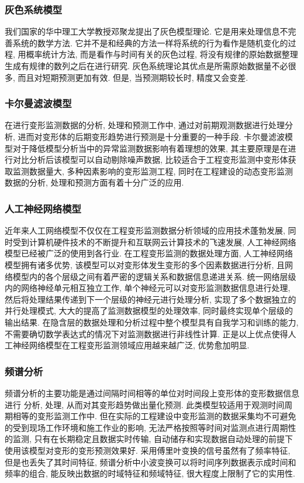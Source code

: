 \subsubsection*{灰色系统模型}
我们国家的华中理工大学教授邓聚龙提出了灰色模型理论. 它是用来处理信息不完善系统的数学方法. 它并不是和经典的方法一样将系统的行为看作是随机变化的过程, 用概率统计方法, 而是看作与时间有关的灰色过程, 将没有规律的原始数据整理生成有规律的数列之后在进行研究. 灰色系统理论其优点是所需原始数据量不必很多, 而且对短期预测更加有效. 但是, 当预测期较长时, 精度又会变差. 

\subsubsection*{卡尔曼滤波模型}
在进行变形监测数据的分析, 处理和预测工作中, 通过对前期观测数据进行处理分析, 进而对变形体的后期变形趋势进行预测是十分重要的一种手段. 卡尔曼滤波模型对于降低模型分析当中的异常监测数据影响有着理想的效果, 其主要原理是在进行对比分析后该模型可以自动剔除噪声数据, 比较适合于工程变形监测中变形体获取监测数据量大, 多种因素影响的变形监测工程, 同时在工程建设的动态变形监测数据的分析, 处理和预测方面有着十分广泛的应用. 

\subsubsection*{人工神经网络模型}
近年来人工网络模型不仅仅在工程变形监测数据分析领域的应用技术蓬勃发展, 同时受到计算机硬件技术的不断提升和互联网云计算技术的飞速发展, 人工神经网络模型已经被广泛的使用到各行业. 在工程变形监测的数据处理方面, 人工神经网络模型拥有诸多优势, 该模型可以对变形体发生变形的多个因素数据进行分析, 且网络模型内的各个层级之间有着严密的逻辑关系和数据信息递进关系. 统一网络层级内的网络神经单元相互独立工作, 单个神经元可以对变形监测数据信息进行处理, 然后将处理结果传递到下一个层级的神经元进行处理分析, 实现了多个数据独立的并行处理模式, 大大的提高了监测数据模型的处理效率, 同时最终实现单个层级的输出结果. 在隐含层的数据处理和分析过程中整个模型具有自我学习和训练的能力, 不需要确切数学表达式的情况下对监测数据进行非线性计算. 正是以上优点使得人工神经网络模型在工程变形监测领域应用越来越广泛, 优势愈加明显. 

\subsubsection*{频谱分析}
频谱分析的主要功能是通过间隔时间相等的单位对时间段上变形体的变形数据信息进行 分析, 处理, 从而对其变形趋势做出量化预测. 此类模型较适用于观测时间周期相等的变形监测工作中. 但在实际的工程建设中变形监测的数据采集均不可避免的受到现场工作环境和施工作业的影响, 无法严格按照等时间对监测点进行周期性的监测, 只有在长期稳定且数据实时传输, 自动储存和实现数据自动处理的前提下使用该模型对变形的变形预测效果好. 采用傅里叶变换的信号虽然有了频率特征, 但是也丢失了其时间特征, 频谱分析中小波变换可以将时间序列数据表示成时间和频率的组合, 能反映出数据的时域特征和频域特征, 很大程度上限制了它的实用性. 


